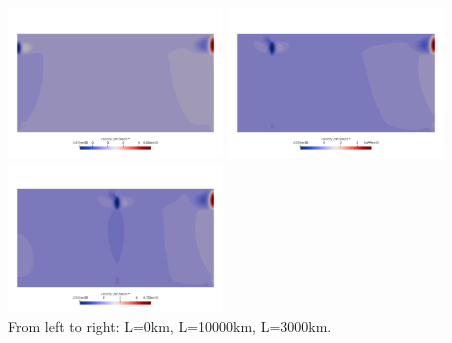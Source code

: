 \begin{center}
\includegraphics[width=5.7cm]{python_codes/fieldstone_143/results/fig9/v0000}
\includegraphics[width=5.7cm]{python_codes/fieldstone_143/results/fig9/v1000}
\includegraphics[width=5.7cm]{python_codes/fieldstone_143/results/fig9/v3000}\\
{\captionfont From left to right: L=0km, L=10000km, L=3000km.}
\end{center}

































